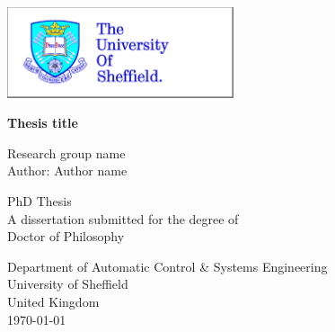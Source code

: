 \begin{titlepage}

\begin{flushleft}
\includegraphics[width=0.5\textwidth]{Title/Figures/UoSLogo}
\end{flushleft}

\vspace*{1cm}

\Huge{\textbf{Thesis title}}
        
\vspace{0.5cm}
        \Large Research group name
        \\
        \large Author: Author name
        \vspace{2.5cm}
        
        \LARGE PhD Thesis\\
        \small A dissertation submitted for the degree of\\
        Doctor of Philosophy
        \vspace{2cm}

        \normalsize
        Department of Automatic Control \& Systems Engineering\\
        University of Sheffield\\
        United Kingdom\\
        \today

\end{titlepage}